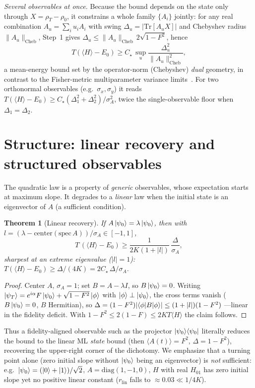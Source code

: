 \documentclass[aps,pra,twocolumn,superscriptaddress,nofootinbib,longbibliography]{revtex4-2}
\newtheorem{theorem}{Theorem}
\newcommand{\Ctrue}{C_{\star}}
\newcommand{\mean}[1]{\langle #1 \rangle}
\newcommand{\Tr}{\mathrm{Tr}}
\begin{document}
\medskip
\noindent\emph{Several observables at once.} Because the bound depends on the state only through
$X=\rho_T-\rho_0$, it constrains a whole family $\{A_i\}$ jointly: for any real combination $A_u=\sum_iu_iA_i$
with swing $\Delta_u=|\Tr[A_uX]|$ and Chebyshev radius $\|A_u\|_{\mathrm{Cheb}}$, Step~1 gives
$\Delta_u\le\|A_u\|_{\mathrm{Cheb}}\,2\sqrt{1-F^2}$, hence
\begin{equation}
T(\mean H-E_0)\ge \Ctrue\,\sup_{u}\frac{\Delta_u^2}{\|A_u\|_{\mathrm{Cheb}}^2},
\label{eq:multi}
\end{equation}
a mean-energy bound set by the operator-norm (Chebyshev) \emph{dual} geometry, in contrast to the Fisher-metric
multiparameter variance limits~\cite{Hamazaki2023QuantumVelocityLimits,Bringewatt2024GeneralizedGeometric}. For
two orthonormal observables (e.g.\ $\sigma_x,\sigma_y$) it reads
$T(\mean H-E_0)\ge\Ctrue(\Delta_1^2+\Delta_2^2)/\sigma_A^2$, twice the single-observable floor when
$\Delta_1=\Delta_2$.

\section{Structure: linear recovery and structured observables}
\label{sec:structure}
The quadratic law is a property of \emph{generic} observables, whose expectation starts at maximum slope. It
degrades to a \emph{linear} law when the initial state is an eigenvector of $A$ (a sufficient condition).
\begin{theorem}[Linear recovery]
If $A\ket{\psi_0}=\lambda\ket{\psi_0}$, then with $l=(\lambda-\mathrm{center}(\mathrm{spec}\,A))/\sigma_A\in[-1,1]$,
\begin{equation}
T\,(\mean{H}-E_0)\ge\frac{1}{2K(1+|l|)}\,\frac{\Delta}{\sigma_A},
\end{equation}
sharpest at an extreme eigenvalue ($|l|=1$): $T(\mean{H}-E_0)\ge \Delta/(4K)=2\Ctrue\,\Delta/\sigma_A$.
\end{theorem}
\begin{proof}
Center $A$, $\sigma_A=1$; set $B=A-\lambda I$, so $B\ket{\psi_0}=0$. Writing
$\ket{\psi_T}=e^{i\alpha}F\ket{\psi_0}+\sqrt{1-F^2}\ket{\phi}$ with $\ket\phi\perp\ket{\psi_0}$, the cross
terms vanish ($B\ket{\psi_0}=0$, $B$ Hermitian), so $\Delta=(1-F^2)|\!\braket{\phi|B|\phi}\!|\le(1+|l|)(1-F^2)$
---linear in the fidelity deficit. With $1-F^2\le2(1-F)\le2KT\mean H$ the claim follows.
\end{proof}
\noindent Thus a fidelity-aligned observable such as the projector $\ket{\psi_0}\!\bra{\psi_0}$ literally
reduces the bound to the linear ML \emph{state} bound (then $\mean{A(t)}=F^2$, $\Delta=1-F^2$), recovering the
upper-right corner of the dichotomy. We emphasize that a turning point alone (zero initial slope without
$\ket{\psi_0}$ being an eigenvector) is \emph{not} sufficient: e.g.\ $\ket{\psi_0}=(\ket0+\ket1)/\sqrt2$,
$A=\mathrm{diag}(1,-1,0)$, $H$ with real $H_{01}$ has zero initial slope yet no positive linear constant
($r_{\mathrm{lin}}$ falls to $\approx0.03\ll1/4K$).
\end{document}
